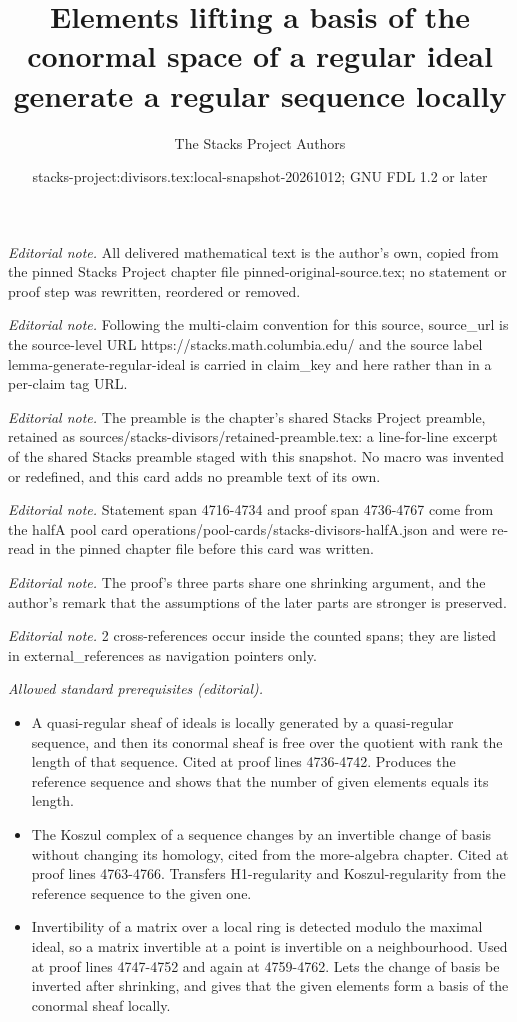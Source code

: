 \documentclass[10pt,a4paper]{amsart}
\title{Elements lifting a basis of the conormal space of a regular ideal generate a regular sequence locally}
\author{The Stacks Project Authors}
\date{stacks-project:divisors.tex:local-snapshot-20261012; GNU FDL 1.2 or later}
\theoremstyle{plain}
\theoremstyle{definition}
\theoremstyle{remark}
\numberwithin{equation}{subsection}
\begin{document}
\maketitle
\noindent\textit{Editorial note.} All delivered mathematical text is the author's own, copied from the pinned Stacks Project chapter file pinned-original-source.tex; no statement or proof step was rewritten, reordered or removed.\par\medskip
\noindent\textit{Editorial note.} Following the multi-claim convention for this source, source\_url is the source-level URL https://stacks.math.columbia.edu/ and the source label lemma-generate-regular-ideal is carried in claim\_key and here rather than in a per-claim tag URL.\par\medskip
\noindent\textit{Editorial note.} The preamble is the chapter's shared Stacks Project preamble, retained as sources/stacks-divisors/retained-preamble.tex: a line-for-line excerpt of the shared Stacks preamble staged with this snapshot. No macro was invented or redefined, and this card adds no preamble text of its own.\par\medskip
\noindent\textit{Editorial note.} Statement span 4716-4734 and proof span 4736-4767 come from the halfA pool card operations/pool-cards/stacks-divisors-halfA.json and were re-read in the pinned chapter file before this card was written.\par\medskip
\noindent\textit{Editorial note.} The proof's three parts share one shrinking argument, and the author's remark that the assumptions of the later parts are stronger is preserved.\par\medskip
\noindent\textit{Editorial note.} 2 cross-references occur inside the counted spans; they are listed in external\_references as navigation pointers only.\par\medskip
\noindent\textit{Allowed standard prerequisites (editorial).}\begin{itemize}
\item A quasi-regular sheaf of ideals is locally generated by a quasi-regular sequence, and then its conormal sheaf is free over the quotient with rank the length of that sequence. Cited at proof lines 4736-4742. Produces the reference sequence and shows that the number of given elements equals its length.
\item The Koszul complex of a sequence changes by an invertible change of basis without changing its homology, cited from the more-algebra chapter. Cited at proof lines 4763-4766. Transfers H1-regularity and Koszul-regularity from the reference sequence to the given one.
\item Invertibility of a matrix over a local ring is detected modulo the maximal ideal, so a matrix invertible at a point is invertible on a neighbourhood. Used at proof lines 4747-4752 and again at 4759-4762. Lets the change of basis be inverted after shrinking, and gives that the given elements form a basis of the conormal sheaf locally.
\end{itemize}\medskip
\end{document}
